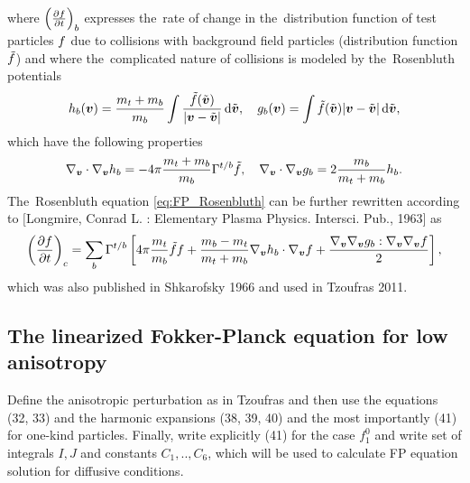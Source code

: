\documentclass[preprint,12pt]{elsarticle}
\begin{document}
where $\left(\frac{\partial{f}}{\partial{t}}\right)_{b}$ expresses the~rate of change in 
the~distribution function of test particles $f$ due to collisions with
background field particles (distribution function $\tilde{f}$) and
where the~complicated nature of collisions is modeled by the~Rosenbluth 
potentials 
\begin{equation}
  h_{b}(\boldsymbol{v}) = \frac{m_t + m_b}{m_b}
  \int \frac{\tilde{f}(\tilde{\boldsymbol{v}})}{|\boldsymbol{v} - \tilde{\boldsymbol{v}}|}\, \text{d}\tilde{\boldsymbol{v}} ,
  \quad g_{b}(\boldsymbol{v}) = \int \tilde{f}(\tilde{\boldsymbol{v}})|\boldsymbol{v} - \tilde{\boldsymbol{v}}|\, \text{d}\tilde{\boldsymbol{v}} ,
  \nonumber
\end{equation}
which have the following properties
\begin{equation}
  \nabla_{\boldsymbol{v}}\cdot\nabla_{\boldsymbol{v}} h_{b} = 
  -4\pi \frac{m_t + m_b}{m_b} \Gamma^{t/b}\tilde{f} ,\quad
  \nabla_{\boldsymbol{v}}\cdot\nabla_{\boldsymbol{v}} g_{b} = 
  2 \frac{m_b}{m_t + m_b} h_{b} .
  \nonumber
\end{equation}
The~Rosenbluth equation \eqref{eq:FP_Rosenbluth} can be further rewritten
according to $[$Longmire, Conrad L. : Elementary Plasma Physics. Intersci. Pub., 1963$]$ as
\begin{equation}
  \left(\frac{\partial{f}}{\partial{t}}\right)_c = \sum_{b} \Gamma^{t/b} 
  \left[ 4\pi \frac{m_{t}}{m_b} \tilde{f} f 
  + \frac{m_b - m_t}{m_t + m_b} \nabla_{\boldsymbol{v}}h_{b}\cdot\nabla_{\boldsymbol{v}} f 
  + \frac{\nabla_{\boldsymbol{v}}\nabla_{\boldsymbol{v}}g_{b} : \nabla_{\boldsymbol{v}}\nabla_{\boldsymbol{v}} f}{2} \right] ,
  \label{eq:FP_Longmire}
\end{equation}
which was also published in Shkarofsky 1966 and used in Tzoufras 2011.


\subsection{The linearized Fokker-Planck equation for low anisotropy}
\label{sec:FP_linear}
Define the anisotropic perturbation as in Tzoufras and then use the equations
(32, 33) and the harmonic expansions (38, 39, 40) and the most importantly (41)
for one-kind particles. Finally, write explicitly (41) for the case $f_1^0$
and write set of integrals $I, J$ and constants $C_1, .., C_6$,
which will be used to calculate FP equation solution for diffusive conditions.
\end{document}
